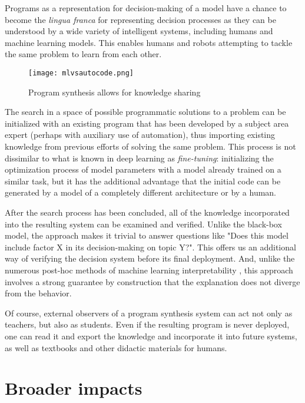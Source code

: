 Programs as a representation for decision-making of a model have a chance to become the \emph{lingua franca} for representing decision processes as they can be understood by a wide variety of intelligent systems, including humans and machine learning models. 
This enables humans and robots attempting to tackle the same problem to learn from each other.

\begin{figure}
    \centering
    \texttt{[image: mlvsautocode.png]}
    \caption{Program synthesis allows for knowledge sharing}
    \label{fig:mlvsautocode}
\end{figure}

The search in a space of possible programmatic solutions to a problem can be initialized with an existing program that has been developed by a subject area expert (perhaps with auxiliary use of automation), thus \textcolor{accent}{importing existing knowledge} from previous efforts of solving the same problem.
This process is not dissimilar to what is known in deep learning as \emph{fine-tuning}: initializing the optimization process of model parameters with a model already trained on a similar task, but it has the additional advantage that the initial code can be generated by a model of a completely different architecture or by a human.

After the search process has been concluded, all of the knowledge incorporated into the resulting system can be \textcolor{accent}{examined and verified}. 
Unlike the black-box model, the approach makes it trivial to answer questions like "Does this model include factor X in its decision-making on topic Y?".
This offers us an additional way of verifying the decision system before its final deployment. 
And, unlike the numerous post-hoc methods of machine learning interpretability \cite{linardatosExplainableAiReview2020}, this approach involves a strong guarantee by construction that the explanation does not diverge from the behavior.

Of course, external observers of a program synthesis system can act not only as teachers, but also as students. 
Even if the resulting program is never deployed, one can read it and \textcolor{accent}{export the knowledge} and incorporate it into future systems, as well as textbooks and other didactic materials for humans.

\newpage
\section{Broader impacts}
\label{sec:impacts}

